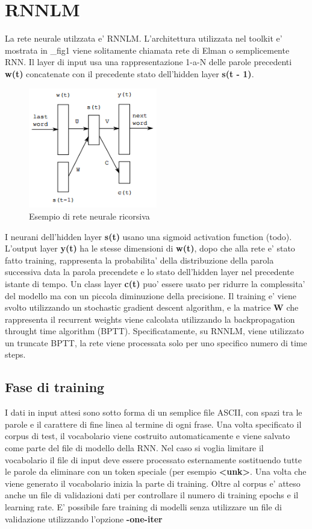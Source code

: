 \documentclass[a4paper,11pt]{book}
\theoremstyle{definition}
\begin{document}
\section{RNNLM}
La rete neurale utilzzata e' RNNLM. L'architettura utilizzata nel toolkit e' mostrata in \_fig1 viene solitamente chiamata rete di Elman o semplicemente RNN. Il layer di input usa una rappresentazione 1-a-N delle 
parole precedenti \textbf{w(t)} concatenate con il precedente stato dell'hidden layer \textbf{s(t - 1)}.
\begin{figure}[h]
  \centering
      \includegraphics[width=0.5\textwidth]{Immagini/rnnlm_rete.png}
      \caption{Esempio di rete neurale ricorsiva}
\end{figure}
I neurani dell'hidden layer \textbf{s(t)} usano una sigmoid activation function (todo).
L'output layer \textbf{y(t)} ha le stesse dimensioni di \textbf{w(t)}, dopo che alla rete e' stato fatto training,
rappresenta la probabilita' della distribuzione della parola successiva data la parola precendete 
e lo stato dell'hidden layer nel precedente istante di tempo.
Un class layer \textbf{c(t)} puo' essere usato per ridurre la complessita' del modello ma con un piccola
diminuzione della precisione.
Il training e' viene svolto utilizzando un stochastic gradient descent algorithm, e la matrice \textbf{W}
che rappresenta il recurrent weights viene calcolata utilizzando la backpropagation throught time algorithm (BPTT).
Specificatamente, su RNNLM, viene utilizzato un truncate BPTT, la rete viene processata solo per uno specifico
numero di time steps.
\subsection{Fase di training}
I dati in input attesi sono sotto forma di un semplice file ASCII, con spazi tra le parole e il carattere di
fine linea al termine di ogni frase.
Una volta specificato il corpus di test, il vocabolario viene costruito automaticamente e viene salvato come parte
del file di modello della RNN.
Nel caso si voglia limitare il vocabolario il file di input deve essere processato esternamente sostituendo
tutte le parole da eliminare con un token speciale (per esempio \textbf{<unk>}.
Una volta che viene generato il vocabolario inizia la parte di training. Oltre al corpus e' atteso anche un
file di validazioni dati per controllare il numero di training epochs e  il learning rate.
E' possibile fare training di modelli senza utilizzare un file di validazione utilizzando l'opzione \textbf{-one-iter}
\end{document}
